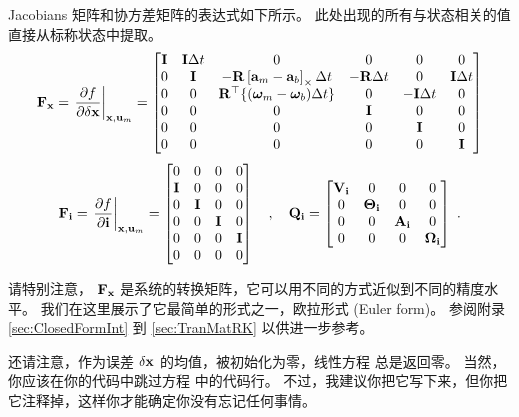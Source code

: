 Jacobians 矩阵和协方差矩阵的表达式如下所示。 
此处出现的所有与状态相关的值直接从标称状态中提取。
%
\begin{equation} \label{equ:Fx_local_euler}
{\bf F}_{\bf x} = \left.\frac{\partial f}{\partial\delta{\bf x}}\right|_{{\bf x},{\bf u}_m} = \begin{bmatrix}
{\bf I} & {\bf I}\Delta t & 0                             & 0               & 0                     & 0 \\
0 & {\bf I}    & -{\bf R}\left[{\bf a}_m-{\bf a}_b\right]_\times\Delta t     & -{\bf R}\Delta t            & 0                     & {\bf I}\Delta t \\
0 & 0    & {\bf R}^{\top}\{({\bm \omega}_m-{\bm \omega}_b)\Delta t\}   & 0               & -{\bf I}\Delta t                  & 0 \\
0 & 0    & 0                             & {\bf I} & 0                     & 0 \\
0 & 0    & 0                             & 0               & {\bf I}  & 0 \\
0 & 0    & 0                             & 0               & 0                     & {\bf I} \\
\end{bmatrix}
\end{equation}%
%
\begin{equation}
{\bf F}_{\bf i} = \left.\frac{\partial f}{\partial{\bf i}}\right|_{{\bf x},{\bf u}_m} = \begin{bmatrix}
0 & 0 & 0 & 0 \\
{\bf I} & 0 & 0 & 0 \\
0 & {\bf I} & 0 & 0 \\
0 & 0 & {\bf I} & 0 \\
0 & 0 & 0 & {\bf I} \\
0 & 0 & 0 & 0 
\end{bmatrix}  
\quad,\quad
{\bf Q}_{\bf i} = \begin{bmatrix}
{\bf V}_{\bf i} & 0        & 0      & 0 \\ 
0      & {\bm \Theta}_{\bf i} & 0      & 0 \\ 
0      & 0        & {\bf A}_{\bf i} & 0 \\ 
0      & 0        & 0      & {\bm \Omega}_{\bf i} 
\end{bmatrix}~.
\end{equation}%
%

请特别注意， ${\bf F}_{\bf x}$ 是系统的转换矩阵，它可以用不同的方式近似到不同的精度水平。 
我们在这里展示了它最简单的形式之一，欧拉形式 (Euler form)。
参阅附录 \ref{sec:ClosedFormInt} 到 \ref{sec:TranMatRK} 以供进一步参考。

还请注意，作为误差 $\delta{\bf x}$ 的均值，被初始化为零，线性方程  总是返回零。 
当然，你应该在你的代码中跳过方程  中的代码行。 
不过，我建议你把它写下来，但你把它注释掉，这样你才能确定你没有忘记任何事情。

